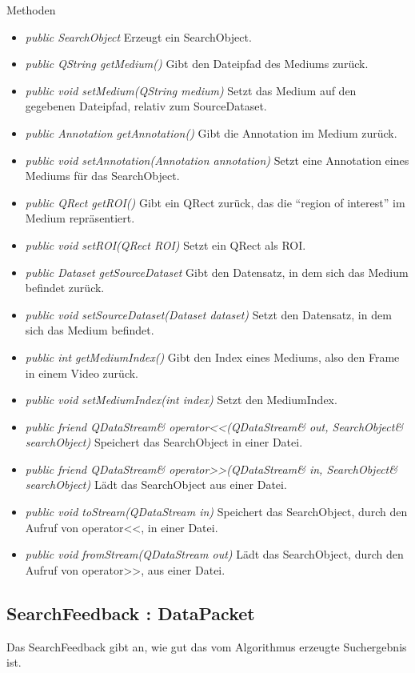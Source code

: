 Methoden
\begin{itemize}
\item \textit{public SearchObject} Erzeugt ein SearchObject.
\item \textit{public QString getMedium()} Gibt den Dateipfad des Mediums zurück.
\item \textit{public void setMedium(QString medium)} Setzt das Medium auf den gegebenen Dateipfad, relativ zum SourceDataset.
\item \textit{public Annotation getAnnotation()} Gibt die Annotation im Medium zurück.
\item \textit{public void setAnnotation(Annotation annotation)} Setzt eine Annotation eines Mediums für das SearchObject.
\item \textit{public QRect getROI()} Gibt ein QRect zurück, das die \enquote{region of interest} im Medium repräsentiert.
\item \textit{public void setROI(QRect ROI)} Setzt ein QRect als ROI.
\item \textit{public Dataset getSourceDataset} Gibt den Datensatz, in dem sich das Medium befindet zurück.
\item \textit{public void setSourceDataset(Dataset dataset)} Setzt den Datensatz, in dem sich das Medium befindet.
\item \textit{public int getMediumIndex()} Gibt den Index eines Mediums, also den Frame in einem Video zurück.
\item \textit{public void setMediumIndex(int index)} Setzt den MediumIndex.
\item \textit{public friend QDataStream\& operator<<(QDataStream\& out, SearchObject\& searchObject)} Speichert das SearchObject in einer Datei.
\item \textit{public friend QDataStream\& operator>>(QDataStream\& in, SearchObject\& searchObject)} Lädt das SearchObject aus einer Datei.
\item \textit{public void toStream(QDataStream in)} Speichert das SearchObject, durch den Aufruf von operator<<, in einer Datei.
\item \textit{public void fromStream(QDataStream out)} Lädt das SearchObject, durch den Aufruf von operator>>, aus einer Datei.
\end{itemize}

\subsection*{SearchFeedback : DataPacket}
Das SearchFeedback gibt an, wie gut das vom Algorithmus erzeugte Suchergebnis ist.

